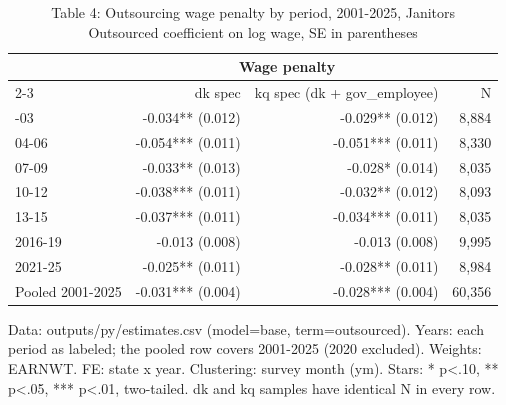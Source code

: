 \begin{table}[!t]
\caption*{
{\large Table 4: Outsourcing wage penalty by period, 2001-2025, Janitors} \\
{\small Outsourced coefficient on log wage, SE in parentheses}
} 

\fontsize{10.0pt}{12.0pt}\selectfont

\begin{tabular*}{\linewidth}{@{\extracolsep{\fill}}l|rrr}
\toprule
  & \multicolumn{2}{c}{Wage penalty} &  \\ 
\cmidrule(lr){2-3}
  & dk spec & kq spec (dk + gov\_employee) & N \\ 
\midrule\addlinespace[2.5pt]
2001-03 & -0.034** (0.012) & -0.029** (0.012) & 8,884 \\
04-06 & -0.054*** (0.011) & -0.051*** (0.011) & 8,330 \\
07-09 & -0.033** (0.013) & -0.028* (0.014) & 8,035 \\
10-12 & -0.038*** (0.011) & -0.032** (0.012) & 8,093 \\
13-15 & -0.037*** (0.011) & -0.034*** (0.011) & 8,035 \\
2016-19 & -0.013 (0.008) & -0.013 (0.008) & 9,995 \\
2021-25 & -0.025** (0.011) & -0.028** (0.011) & 8,984 \\
Pooled 2001-2025 & -0.031*** (0.004) & -0.028*** (0.004) & 60,356 \\
\bottomrule
\end{tabular*}
\begin{minipage}{\linewidth}
Data: outputs/py/estimates.csv (model=base, term=outsourced). Years: each period as labeled; the pooled row covers 2001-2025 (2020 excluded). Weights: EARNWT. FE: state x year. Clustering: survey month (ym). Stars: * p<.10, ** p<.05, *** p<.01, two-tailed. dk and kq samples have identical N in every row.\\
\end{minipage}
\end{table}
